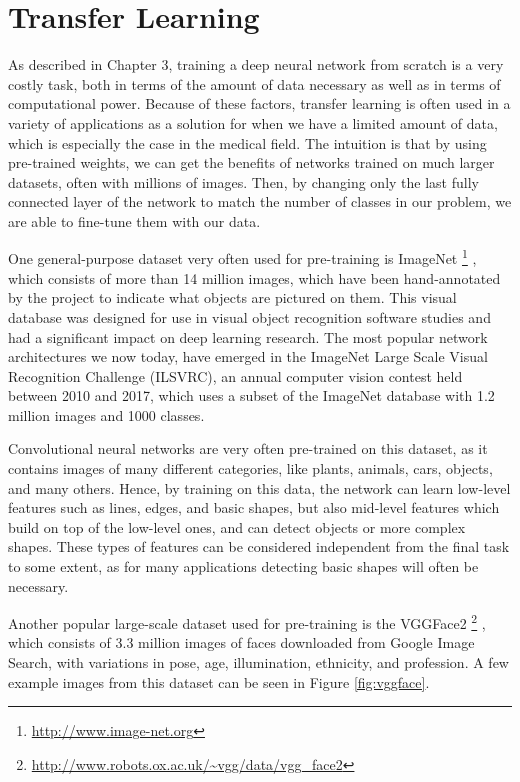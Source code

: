 \section{Transfer Learning}

As described in Chapter 3, training a deep neural network from scratch is a very costly task, both in terms of the amount of data necessary as well as in terms of computational power. Because of these factors, transfer learning is often used in a variety of applications as a solution for when we have a limited amount of data, which is especially the case in the medical field. The intuition is that by using pre-trained weights, we can get the benefits of networks trained on much larger datasets, often with millions of images. Then, by changing only the last fully connected layer of the network to match the number of classes in our problem, we are able to fine-tune them with our data.

One general-purpose dataset very often used for pre-training is ImageNet \footnote{\url{http://www.image-net.org}} \citep{DengDSLL009}, which consists of more than 14 million images, which have been hand-annotated by the project to indicate what objects are pictured on them. This visual database was designed for use in visual object recognition software studies and had a significant impact on deep learning research. The most popular network architectures we now today, have emerged in the ImageNet Large Scale Visual Recognition Challenge (ILSVRC), an annual computer vision contest held between 2010 and 2017, which uses a subset of the ImageNet database with 1.2 million images and 1000 classes. 

Convolutional neural networks are very often pre-trained on this dataset, as it contains images of many different categories, like plants, animals, cars, objects, and many others. Hence, by training on this data, the network can learn low-level features such as lines, edges, and basic shapes, but also mid-level features which build on top of the low-level ones, and can detect objects or more complex shapes. These types of features can be considered independent from the final task to some extent, as for many applications detecting basic shapes will often be necessary.

Another popular large-scale dataset used for pre-training is the VGGFace2 \footnote{\url{http://www.robots.ox.ac.uk/~vgg/data/vgg_face2}} \citep{Cao2018}, which consists of 3.3 million images of faces downloaded from Google Image Search, with variations in pose, age, illumination, ethnicity, and profession. A few example images from this dataset can be seen in Figure \ref{fig:vggface}.

